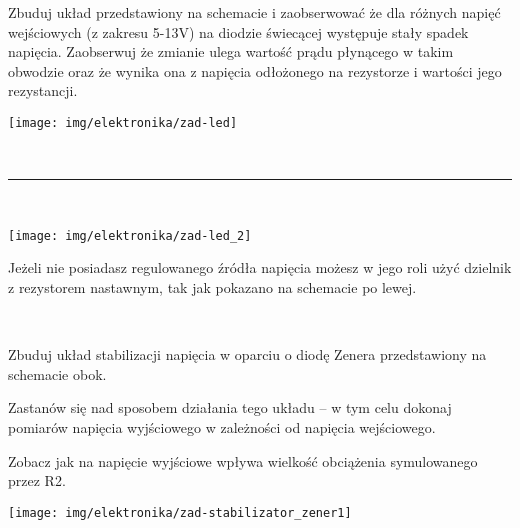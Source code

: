 \dbEntryCheckResults
\noindent\begin{minipage}[b]{0.7\textwidth}
Zbuduj układ przedstawiony na schemacie i zaobserwować że dla różnych napięć wejściowych (z zakresu 5-13V) na diodzie świecącej występuje stały spadek napięcia.
Zaobserwuj że zmianie ulega wartość prądu płynącego w takim obwodzie oraz że wynika ona z napięcia odłożonego na rezystorze i wartości jego rezystancji.
\end{minipage}
\hfill
\begin{minipage}[b]{0.25\textwidth}
\texttt{[image: img/elektronika/zad-led]}\vspace{0.5cm}
\end{minipage}

\hfill \rule{0.8\textwidth}{.3pt}\hfill 

\noindent\begin{minipage}[b]{0.27\textwidth}
\texttt{[image: img/elektronika/zad-led\_2]}
\end{minipage}
\hfill
\begin{minipage}[b]{0.6\textwidth}
Jeżeli nie posiadasz regulowanego źródła napięcia możesz w jego roli użyć dzielnik z rezystorem nastawnym, tak jak pokazano na schemacie po lewej.
\vspace{1.3cm}
\end{minipage}
\hfill 
\fi


\dbEntryCheckResults
\noindent\begin{minipage}[b]{0.77\textwidth}
Zbuduj układ stabilizacji napięcia w oparciu o diodę Zenera przedstawiony na schemacie obok.

Zastanów się nad sposobem działania tego układu – w tym celu dokonaj pomiarów napięcia wyjściowego w zależności od napięcia wejściowego.

Zobacz jak na napięcie wyjściowe wpływa wielkość obciążenia symulowanego przez R2.
\vspace{13pt}
\end{minipage}
\hfill
\begin{minipage}[b]{0.17\textwidth}
\texttt{[image: img/elektronika/zad-stabilizator\_zener1]}
\end{minipage}
\fi
